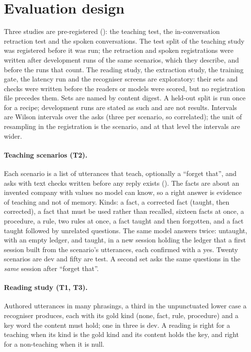 
\section{Evaluation design}\label{sec:evaluation}

Three studies are pre-registered (): the teaching test, the in-conversation retraction test and the spoken conversations. The test split of the teaching study was registered before it was run; the retraction and spoken registrations were written after development runs of the same
scenarios, which they describe, and before the runs that count. The reading study, the extraction study, the training gate, the latency run and the recogniser screens are exploratory: their sets and checks were written before the readers or models were scored, but no registration file precedes them.
Sets are named by content digest. A held-out split is run once for a recipe; development runs are stated as such and are not results. Intervals are Wilson intervals over the asks (three per scenario, so correlated); the unit of resampling in the registration is the scenario, and at that level the intervals are wider.

\paragraph{Teaching scenarios (T2).}
Each scenario is a list of utterances that teach, optionally a ``forget that'', and asks with text checks written before any reply exists (). The facts are about an invented company with values no model
can know, so a right answer is evidence of teaching and not of memory. Kinds: a fact, a corrected fact (taught, then corrected), a fact that must be used rather than recalled, sixteen facts at once, a procedure, a rule,
two rules at once, a fact taught and then forgotten, and a fact taught followed by unrelated questions. The same model answers twice: untaught, with an empty ledger, and taught, in a new session holding the ledger that a first
session built from the scenario's utterances, each confirmed with a yes. Twenty scenarios are dev and fifty are test. A second set asks the same questions in the \emph{same} session after ``forget that''.

\paragraph{Reading study (T1, T3).}
Authored utterances in many phrasings, a third in the unpunctuated lower case a recogniser produces, each with its gold kind (none, fact, rule, procedure) and a key word the content must hold; one in three is dev. A reading is right
for a teaching when its kind is the gold kind and its content holds the key, and right for a non-teaching when it is null.

